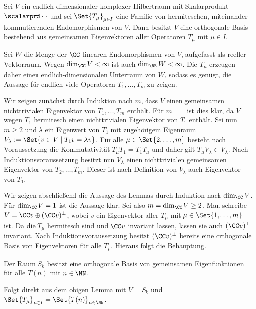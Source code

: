 \begin{lemm}
Sei $V$ ein endlich-dimensionaler komplexer Hilbertraum mit Skalarprodukt $\scalarprd \cdot \cdot$ und sei $\Set {T_\mu}_{\mu \in I}$ eine Familie von hermiteschen, miteinander kommutierenden Endomorphismen von $V$. Dann besitzt $V$ eine orthogonale Basis bestehend aus gemeinsamen Eigenvektoren aller Operatoren $T_\mu$ mit $\mu \in I$. 
\end{lemm}

\begin{bewe}
Sei $W$ die Menge der $\CC$-linearen Endomorphismen von $V$, aufgefasst als reeller Vektorraum. Wegen $\dim_\CC V < \infty$ ist auch $\dim_\RR W < \infty$. Die $T_\mu$ erzeugen daher einen endlich-dimensionalen Unterraum von $W$, sodass es genügt, die Aussage für endlich viele Operatoren $T_1, \ldots, T_m$ zu zeigen.

Wir zeigen zunächst durch Induktion nach $m$, dass $V$ einen gemeinsamen nichttrivialen Eigenvektor von $T_1, \ldots, T_m$ enthält. Für $m = 1$ ist dies klar, da $V$ wegen $T_1$ hermitesch einen nichttrivialen Eigenvektor von $T_1$ enthält. Sei nun $m \geq 2$ und $\lambda$ ein Eigenwert von $T_1$ mit zugehörigem Eigenraum $V_\lambda := \Set {v \in V \mid T_1 v = \lambda v }$. Für alle $\mu \in \Set {2, \ldots, m}$ besteht nach Voraussetzung die Kommutativität $T_\mu T_1 = T_1 T_\mu$ und daher gilt $T_\mu V_\lambda \subset V_\lambda$. Nach Induktionsvoraussetzung besitzt nun $V_\lambda$ einen nichttrivialen gemeinsamen Eigenvektor von $T_2, \ldots, T_m$. Dieser ist nach Definition von $V_\lambda$ auch Eigenvektor von $T_1$.

Wir zeigen abschließend die Aussage des Lemmas durch Induktion nach $\dim_\CC V$. Für $\dim_\CC V = 1$ ist die Aussage klar. Sei also $m = \dim_\CC V \geq 2$. Man schreibe $V = \CC v \oplus (\CC v)^\bot$, wobei $v$ ein Eigenvektor aller $T_\mu$ mit $\mu \in \Set {1, \ldots, m}$ ist. Da die $T_\mu$ hermitesch sind und $\CC v$ invariant lassen, lassen sie auch $(\CC v)^\bot$ invariant. Nach Induktionsvoraussetzung besitzt $(\CC v)^\bot$ bereits eine orthogonale Basis von Eigenvektoren für alle $T_\mu$. Hieraus folgt die Behauptung.
\end{bewe}

\begin{koro}
Der Raum $S_k$ besitzt eine orthogonale Basis von gemeinsamen Eigenfunktionen für alle $T(n)$ mit $n \in \NN$.
\end{koro}
\begin{bewe}
Folgt direkt aus dem obigen Lemma mit $V = S_k$ und $\Set {T_\mu}_{\mu \in I} = \Set {T(n)}_{n \in \NN}$.
\end{bewe}

